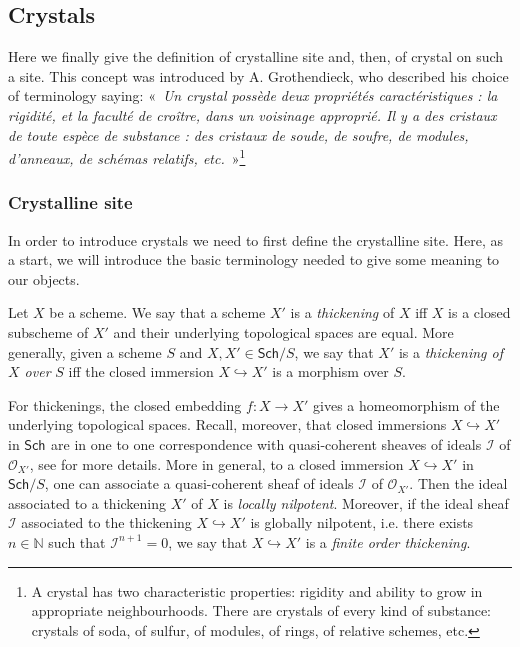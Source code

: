 \subsection{Crystals}
Here we finally give the definition of crystalline site and, then, of
crystal on such a site.
This concept was introduced by A. Grothendieck, 
who described his choice of terminology saying:
«~{\em Un crystal possède deux propriétés caractéristiques : la rigidité, 
et la faculté de croître, dans un voisinage approprié. 
Il y a des cristaux de toute espèce de substance : des cristaux de soude, 
de soufre, de modules, d'anneaux, de schémas relatifs, etc.}~»\footnote{A
crystal has two characteristic properties: rigidity and ability to grow
in appropriate neighbourhoods.
There are crystals of every kind of substance: crystals of soda, of sulfur,
of modules, of rings, of relative schemes, etc.}



\subsubsection{Crystalline site}
In order to introduce crystals we need to first define the crystalline site.
Here, as a start, we will introduce the basic terminology needed to give
some meaning to our objects.


\begin{defn}[Thickening]
	Let $X$ be a scheme.
	We say that a scheme $X'$ is a {\em thickening} of $X$ iff
	$X$ is a closed subscheme of $X'$ and their underlying topological
	spaces are equal.
	More generally, given a scheme $S$ and $X, X' \in \mathsf{Sch}/S$,
	we say that $X'$ is a {\em thickening of $X$ over} $S$ iff
	the closed immersion $X \hookrightarrow X'$ is a morphism over $S$.
\end{defn}


\begin{rem}[]\label{rem:thickeningIdeal}
	For thickenings, the closed embedding $f\colon X \to X'$ gives a homeomorphism
	of the underlying topological spaces.
	Recall, moreover, that closed immersions $X \hookrightarrow X'$ in $\mathsf{Sch}_{  }$
	are in one to one correspondence with quasi-coherent sheaves of ideals
	$\mathcal{I}$ of $\mathcal{O}_{ X' }$, see
	\cite[\href{https://stacks.math.columbia.edu/tag/01QN}{Section 01QN}]{SP}
	for more details.
	More in general, to a closed immersion $X \hookrightarrow X'$ in
	$\mathsf{Sch}/S$, one can associate a quasi-coherent sheaf of ideals
	$\mathcal{I}$ of $\mathcal{O}_{ X' }$.
	Then the ideal associated to a thickening $X'$ of $X$ 
	is {\em locally nilpotent}.
	Moreover, if the ideal sheaf $\mathcal{I}$ associated to the thickening
	$X \hookrightarrow X'$ is globally nilpotent, i.e. there exists $n \in \mathbb{N}$
	such that $\mathcal{I}^{n+1} = 0$, we say that $X \hookrightarrow X'$ 
	is a {\em finite order thickening}.
\end{rem}



